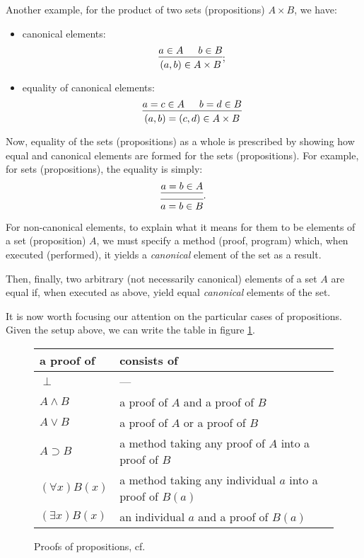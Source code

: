 Another example, for the product of two sets (propositions) $ A \times B $, we have:
\begin{itemize}
\item canonical elements:
  \[
    \begin{prooftree}
      \hypo{a \in A} \hypo{b \in B} \infer2{(a, b) \in A \times B}
    \end{prooftree};
  \]
\item equality of canonical elements:
  \[
    \begin{prooftree}
      \hypo{a = c \in A} \hypo{b = d \in B}
      \infer2{(a, b) = (c, d) \in A \times B}
    \end{prooftree}
  \]
\end{itemize}

Now, equality of the sets (propositions) as a whole is prescribed by showing
how equal and canonical elements are formed for the sets (propositions).
For example, for sets (propositions), the equality is simply:
\[
  \begin{prooftree}
    \hypo{a = b \in A}
    \infer1{}
    \infer1{a = b \in B}
  \end{prooftree}.
\]

For non-canonical elements, to explain what it means for them to be elements
of a set (proposition) $ A $, we must specify a method (proof, program) which,
when executed (performed), it yields a \emph{canonical} element of the set as a
result.

Then, finally, two arbitrary (not necessarily canonical) elements of
a set $ A $ are equal if, when executed as above, yield equal
\emph{canonical} elements of the set.

\vspace{0.3cm}

It is now worth focusing our attention on the particular cases of propositions.
Given the setup above, we can write the table in figure \ref{fig:proofs}.

\begin{figure}[!htb]
  \centering
  \begin{tabular}{l|l}
    a proof of & consists of \\
    \hline
    $ \perp $ & --- \\
    $ A \land B $ & a proof of $ A $ and a proof of $ B$ \\
    $ A \lor B $ & a proof of $ A $ or a proof of $ B $ \\
    $ A \supset B $ & a method taking any proof of $ A $ into a proof of $ B $ \\
    $ (\forall x) B(x) $ & a method taking any individual $ a $ into a proof of $ B(a) $ \\
    $ (\exists x)B(x) $ & an individual $ a $ and a proof of $ B(a) $
  \end{tabular}
  \caption{Proofs of propositions, cf.\ \cite[p.\ 7]{mltt}}
  \label{fig:proofs}
\end{figure}

